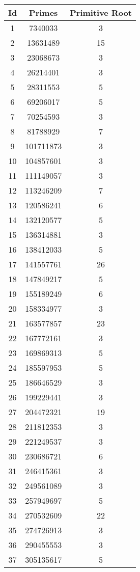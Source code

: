 \begin{spacing}{0.97}
\noindent \begin{tabular}{ccc}
\toprule
       Id & Primes & Primitive Root\\
\midrule 1 & 7340033 & 3\\
 2 & 13631489 & 15\\
 3 & 23068673 & 3\\
 4 & 26214401 & 3\\
 5 & 28311553 & 5\\
 6 & 69206017 & 5\\
 7 & 70254593 & 3\\
 8 & 81788929 & 7\\
 9 & 101711873 & 3\\
 10 & 104857601 & 3\\
 11 & 111149057 & 3\\
 12 & 113246209 & 7\\
 13 & 120586241 & 6\\
 14 & 132120577 & 5\\
 15 & 136314881 & 3\\
 16 & 138412033 & 5\\
 17 & 141557761 & 26\\
 18 & 147849217 & 5\\
 19 & 155189249 & 6\\
 20 & 158334977 & 3\\
 21 & 163577857 & 23\\
 22 & 167772161 & 3\\
 23 & 169869313 & 5\\
 24 & 185597953 & 5\\
 25 & 186646529 & 3\\
 26 & 199229441 & 3\\
 27 & 204472321 & 19\\
 28 & 211812353 & 3\\
 29 & 221249537 & 3\\
 30 & 230686721 & 6\\
 31 & 246415361 & 3\\
 32 & 249561089 & 3\\
 33 & 257949697 & 5\\
 34 & 270532609 & 22\\
 35 & 274726913 & 3\\
 36 & 290455553 & 3\\
 37 & 305135617 & 5\\
\bottomrule
\end{tabular}

\end{spacing}
